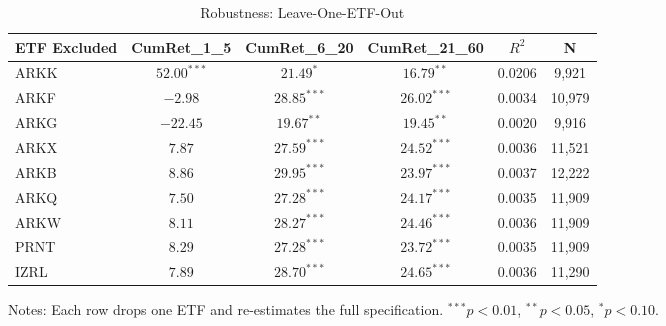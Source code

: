 \begin{table}[htbp]\centering
\caption{Robustness: Leave-One-ETF-Out}
\label{tab:leaveoneout}
\begin{tabular}{lccccc}
\toprule
ETF Excluded & CumRet\_1\_5 & CumRet\_6\_20 & CumRet\_21\_60 & $R^2$ & N \\
\midrule
ARKK & $52.00^{***}$ & $21.49^{*}$ & $16.79^{**}$ & 0.0206 & 9,921 \\
ARKF & $-2.98$ & $28.85^{***}$ & $26.02^{***}$ & 0.0034 & 10,979 \\
ARKG & $-22.45$ & $19.67^{**}$ & $19.45^{**}$ & 0.0020 & 9,916 \\
ARKX & $7.87$ & $27.59^{***}$ & $24.52^{***}$ & 0.0036 & 11,521 \\
ARKB & $8.86$ & $29.95^{***}$ & $23.97^{***}$ & 0.0037 & 12,222 \\
ARKQ & $7.50$ & $27.28^{***}$ & $24.17^{***}$ & 0.0035 & 11,909 \\
ARKW & $8.11$ & $28.27^{***}$ & $24.46^{***}$ & 0.0036 & 11,909 \\
PRNT & $8.29$ & $27.28^{***}$ & $23.72^{***}$ & 0.0035 & 11,909 \\
IZRL & $7.89$ & $28.70^{***}$ & $24.65^{***}$ & 0.0036 & 11,290 \\
\bottomrule
\end{tabular}
\begin{tablenotes}\small
\item Notes: Each row drops one ETF and re-estimates the full specification.
$^{***}p<0.01$, $^{**}p<0.05$, $^{*}p<0.10$.
\end{tablenotes}
\end{table}